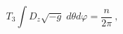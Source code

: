 \begin{equation}
T_3\int D_z\sqrt{-g}\;d\theta d\varphi =\frac{n}{2\pi}\ ,
\label{ec}
\end{equation}

